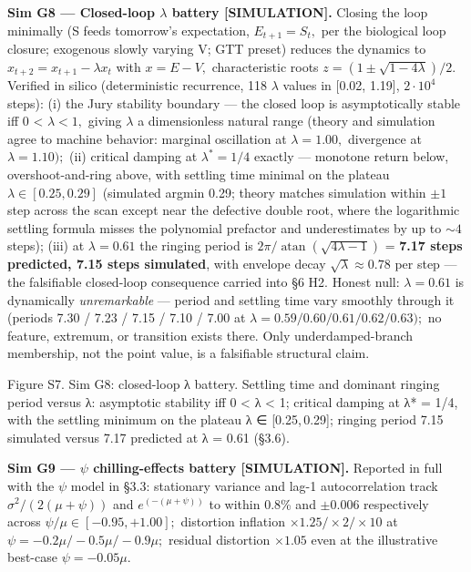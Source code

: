 \documentclass[
]{article}
\begin{document}
\textbf{Sim G8 --- Closed-loop \(\lambda\) battery {[}SIMULATION{]}.}
Closing the loop minimally (S feeds tomorrow's expectation,
\(E_{t+1} = S_t,\) per the biological loop closure; exogenous slowly
varying V; GTT preset) reduces the dynamics to
\(x_{t+2} = x_{t+1} - \lambda x_t\) with \(x = E - V,\) characteristic
roots \(z = (1 \pm \sqrt{1 - 4\lambda})/2.\) Verified in silico
(deterministic recurrence, 118 \(\lambda\) values in {[}0.02, 1.19{]},
\(2\cdot10^{4}\) steps): (i) the Jury stability boundary --- the closed
loop is asymptotically stable iff 0 \textless{} \(\lambda < 1,\) giving
\(\lambda\) a dimensionless natural range (theory and simulation agree
to machine behavior: marginal oscillation at \(\lambda = 1.00,\)
divergence at \(\lambda = 1.10);\) (ii) critical damping at
\(\lambda^{*} = 1/4\) exactly --- monotone return below,
overshoot-and-ring above, with settling time minimal on the plateau
\(\lambda \in [0.25, 0.29]\) (simulated argmin 0.29; theory matches
simulation within \(\pm1\) step across the scan except near the
defective double root, where the logarithmic settling formula misses the
polynomial prefactor and underestimates by up to \(\sim4\) steps); (iii)
at \(\lambda = 0.61\) the ringing period is
\(2\pi/\mathop{\mathrm{atan}}(\sqrt{4\lambda-1})\) = \textbf{7.17 steps
predicted, 7.15 steps simulated}, with envelope decay
\(\sqrt{\lambda} \approx 0.78\) per step --- the falsifiable closed-loop
consequence carried into §6 H2. Honest null: \(\lambda = 0.61\) is
dynamically \emph{unremarkable} --- period and settling time vary
smoothly through it (periods 7.30 / 7.23 / 7.15 / 7.10 / 7.00 at
\(\lambda = 0.59/0.60/0.61/0.62/0.63);\) no feature, extremum, or
transition exists there. Only underdamped-branch membership, not the
point value, is a falsifiable structural claim.

Figure S7. Sim G8: closed-loop {λ} battery. Settling time and dominant
ringing period versus {λ}: asymptotic stability iff
{0 \textless{} λ \textless{} 1}; critical damping at λ* = 1/4, with the
settling minimum on the plateau {λ ∈ {[}0.25, 0.29{]}}; ringing period
{7.15} simulated versus {7.17} predicted at {λ = 0.61} (§3.6).

\textbf{Sim G9 --- \(\psi\) chilling-effects battery {[}SIMULATION{]}.}
Reported in full with the \(\psi\) model in §3.3: stationary variance
and lag-1 autocorrelation track \(\sigma^{2}/(2(\mu+\psi))\) and
\(e^(-(\mu+\psi))\) to within 0.8\% and \(\pm0.006\) respectively across
\(\psi/\mu \in [-0.95, +1.00];\) distortion inflation
\(\times1.25 / \times2 / \times10\) at
\(\psi = -0.2\mu / -0.5\mu / -0.9\mu;\) residual distortion
\(\times1.05\) even at the illustrative best-case \(\psi = -0.05\mu.\)
\end{document}
